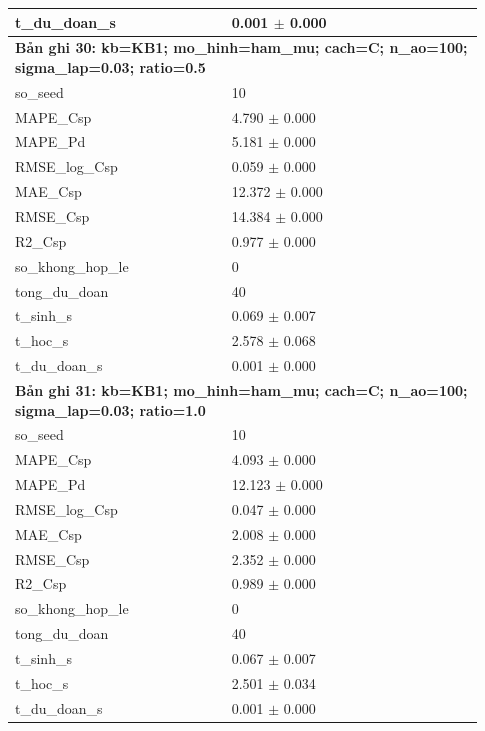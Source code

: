 \begin{longtable}{p{0.43\linewidth}p{0.50\linewidth}}
t\_\allowbreak du\_\allowbreak doan\_\allowbreak s & 0.001 $\pm$ 0.000 \\
\midrule
\multicolumn{2}{p{0.95\linewidth}}{\textbf{Bản ghi 30: kb=KB1; mo\_hinh=ham\_mu; cach=C; n\_ao=100; sigma\_lap=0.03; ratio=0.5}} \\
so\_\allowbreak seed & 10 \\
MAPE\_\allowbreak Csp & 4.790 $\pm$ 0.000 \\
MAPE\_\allowbreak Pd & 5.181 $\pm$ 0.000 \\
RMSE\_\allowbreak log\_\allowbreak Csp & 0.059 $\pm$ 0.000 \\
MAE\_\allowbreak Csp & 12.372 $\pm$ 0.000 \\
RMSE\_\allowbreak Csp & 14.384 $\pm$ 0.000 \\
R2\_\allowbreak Csp & 0.977 $\pm$ 0.000 \\
so\_\allowbreak khong\_\allowbreak hop\_\allowbreak le & 0 \\
tong\_\allowbreak du\_\allowbreak doan & 40 \\
t\_\allowbreak sinh\_\allowbreak s & 0.069 $\pm$ 0.007 \\
t\_\allowbreak hoc\_\allowbreak s & 2.578 $\pm$ 0.068 \\
t\_\allowbreak du\_\allowbreak doan\_\allowbreak s & 0.001 $\pm$ 0.000 \\
\midrule
\multicolumn{2}{p{0.95\linewidth}}{\textbf{Bản ghi 31: kb=KB1; mo\_hinh=ham\_mu; cach=C; n\_ao=100; sigma\_lap=0.03; ratio=1.0}} \\
so\_\allowbreak seed & 10 \\
MAPE\_\allowbreak Csp & 4.093 $\pm$ 0.000 \\
MAPE\_\allowbreak Pd & 12.123 $\pm$ 0.000 \\
RMSE\_\allowbreak log\_\allowbreak Csp & 0.047 $\pm$ 0.000 \\
MAE\_\allowbreak Csp & 2.008 $\pm$ 0.000 \\
RMSE\_\allowbreak Csp & 2.352 $\pm$ 0.000 \\
R2\_\allowbreak Csp & 0.989 $\pm$ 0.000 \\
so\_\allowbreak khong\_\allowbreak hop\_\allowbreak le & 0 \\
tong\_\allowbreak du\_\allowbreak doan & 40 \\
t\_\allowbreak sinh\_\allowbreak s & 0.067 $\pm$ 0.007 \\
t\_\allowbreak hoc\_\allowbreak s & 2.501 $\pm$ 0.034 \\
t\_\allowbreak du\_\allowbreak doan\_\allowbreak s & 0.001 $\pm$ 0.000 \\

\end{longtable}
